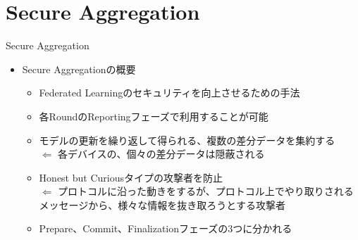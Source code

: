 \documentclass[dvipdfmx,notheorems,t]{beamer}
\begin{document}
\section{Secure Aggregation}

\begin{frame}{Secure Aggregation}

\begin{itemize}
	\item Secure Aggregationの概要
	\begin{itemize}
		\item Federated Learningのセキュリティを向上させるための手法
		\item 各RoundのReportingフェーズで利用することが可能
		\newline
		
		\item モデルの更新を繰り返して得られる、複数の差分データを集約する \\
		$\Leftarrow$ 各デバイスの、個々の差分データは隠蔽される
		\newline
		
		\item \alert{Honest but Curious}タイプの攻撃者を防止 \\
		$\Leftarrow$ プロトコルに沿った動きをするが、プロトコル上でやり取りされるメッセージから、様々な情報を抜き取ろうとする攻撃者
		\newline
		
		\item \alert{Prepare}、\alert{Commit}、\alert{Finalization}フェーズの3つに分かれる
	\end{itemize}
\end{itemize}

\end{frame}
\end{document}
